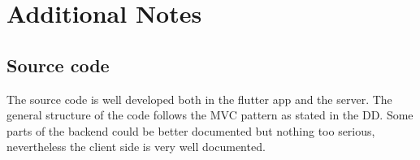 \chapter{Additional Notes}
\section{Source code}
The source code is well developed both in the flutter app and the server. The general structure of the code follows the MVC pattern as stated in the DD.\newline
Some parts of the backend could be better documented but nothing too serious, nevertheless the client side is very well documented.
